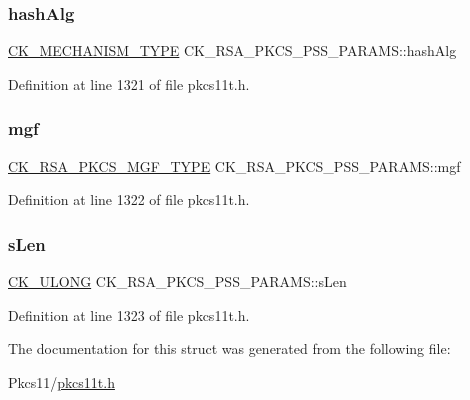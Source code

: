 \subsubsection{\texorpdfstring{hash\+Alg}{hashAlg}}
{\footnotesize\ttfamily \hyperlink{pkcs11t_8h_aaf1084907f5cc09a3e0b85ab022a240d}{C\+K\+\_\+\+M\+E\+C\+H\+A\+N\+I\+S\+M\+\_\+\+T\+Y\+PE} C\+K\+\_\+\+R\+S\+A\+\_\+\+P\+K\+C\+S\+\_\+\+P\+S\+S\+\_\+\+P\+A\+R\+A\+M\+S\+::hash\+Alg}



Definition at line 1321 of file pkcs11t.\+h.

\mbox{\label{struct_c_k___r_s_a___p_k_c_s___p_s_s___p_a_r_a_m_s_a61dc8196e9a08bb24683c6d4836fdd75}} 
\subsubsection{\texorpdfstring{mgf}{mgf}}
{\footnotesize\ttfamily \hyperlink{pkcs11t_8h_a85bafbc5ca956ad99bbc6068334a98e6}{C\+K\+\_\+\+R\+S\+A\+\_\+\+P\+K\+C\+S\+\_\+\+M\+G\+F\+\_\+\+T\+Y\+PE} C\+K\+\_\+\+R\+S\+A\+\_\+\+P\+K\+C\+S\+\_\+\+P\+S\+S\+\_\+\+P\+A\+R\+A\+M\+S\+::mgf}



Definition at line 1322 of file pkcs11t.\+h.

\mbox{\label{struct_c_k___r_s_a___p_k_c_s___p_s_s___p_a_r_a_m_s_a04aaadbd6be8a61d43ea4a15b6c562ed}} 
\subsubsection{\texorpdfstring{s\+Len}{sLen}}
{\footnotesize\ttfamily \hyperlink{pkcs11t_8h_a35181858a3b7a0a81f49d180d8f446ef}{C\+K\+\_\+\+U\+L\+O\+NG} C\+K\+\_\+\+R\+S\+A\+\_\+\+P\+K\+C\+S\+\_\+\+P\+S\+S\+\_\+\+P\+A\+R\+A\+M\+S\+::s\+Len}



Definition at line 1323 of file pkcs11t.\+h.



The documentation for this struct was generated from the following file\+:\begin{DoxyCompactItemize}
\item 
Pkcs11/\hyperlink{pkcs11t_8h}{pkcs11t.\+h}\end{DoxyCompactItemize}
